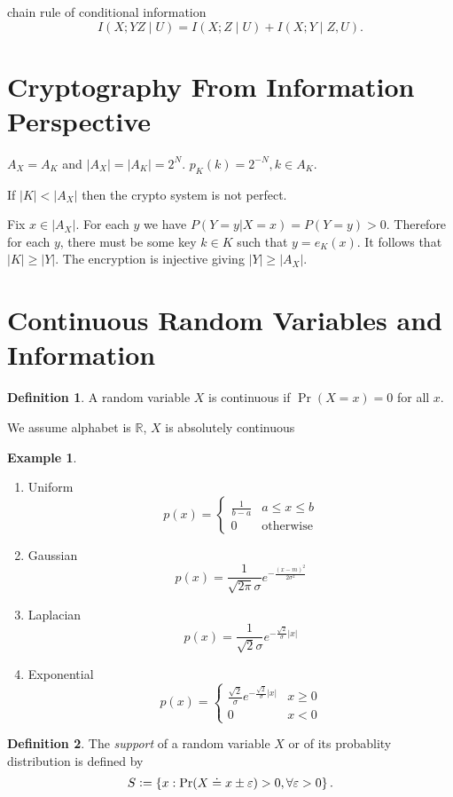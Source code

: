 \documentclass{report}
\newcommand{\R}{\mathbb{R}}
\newcommand{\set}[1]{\left\lbrace #1 \right\rbrace}
\newcommand{\defeq}{\vcentcolon=}
\theoremstyle{definition}
\newtheorem{definition}{Definition}[section]
\newtheorem{example}{Example}[section]
\theoremstyle{remark}
\numberwithin{equation}{section}
\begin{document}
chain rule of conditional information
\[I(X; YZ \mid U) = I(X; Z \mid U) + I(X; Y \mid Z, U).\]

\section{Cryptography From Information Perspective}

$A_X = A_K$ and $|A_X| = |A_K| = 2^N$. $p_K(k) = 2^{-N}, k \in A_K$.

If $|K| < |A_X|$ then the crypto system is not perfect.

Fix $x \in |A_X|$. For each $y$ we have
$P(Y = y|X = x) = P(Y = y) > 0$. Therefore for each $y$, there
must be some key $k \in K$ such that $y = e_K(x)$. It follows that
$|K| \geq |Y|$. The encryption is injective giving $|Y| \geq |A_X|$.

\section{Continuous Random Variables and Information}
\begin{definition}
  A random variable $X$ is continuous if $\Pr(X = x) = 0$ for all $x$.
\end{definition}
We assume alphabet is $\R$, $X$ is absolutely continuous

\begin{example}
  \begin{enumerate}
    \item Uniform \[p(x) = \begin{cases}
      \frac{1}{b-a} & a \leq x \leq b \\
      0 & \text{otherwise}
    \end{cases}\]
    \item Gaussian \[p(x) = \frac{1}{\sqrt{2\pi}\sigma}e^{-\frac{(x-m)^2}{2\sigma^2}}\]
    \item Laplacian \[p(x) = \frac{1}{\sqrt{2}\sigma}e^{-\frac{\sqrt{2}}{\sigma}|x|}\]
    \item Exponential \[p(x) = \begin{cases}
      \frac{\sqrt{2}}{\sigma}e^{-\frac{\sqrt{2}}{\sigma}|x|} & x \geq 0 \\
      0 & x < 0
    \end{cases}\]
  \end{enumerate}
\end{example}

\begin{definition}
  The \emph{support} of a random variable $X$ or of its probablity distribution is defined by \[S \defeq \set{x: \Pr(X \doteq x \pm \varepsilon) > 0, \forall \varepsilon>0}.\]
\end{definition}
\end{document}
